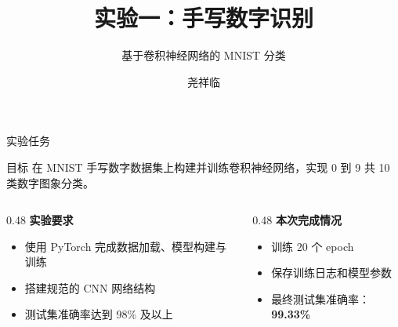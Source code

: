 \documentclass[aspectratio=169,10pt]{ctexbeamer}
\title{实验一：手写数字识别}
\subtitle{基于卷积神经网络的 MNIST 分类}
\author{尧祥临 \quad 202518023406038}
\institute{中国科学院大学 \quad 前沿交叉科学学院\\2026年春季学期\quad 深度学习}
\date{}
\begin{document}
\begin{frame}
	\titlepage
\end{frame}

\begin{frame}{实验任务}
	\begin{block}{目标}
		在 MNIST 手写数字数据集上构建并训练卷积神经网络，实现 0 到 9 共 10 类数字图象分类。
	\end{block}

	\begin{columns}[T,onlytextwidth]
		\begin{column}{0.48\textwidth}
			\textbf{实验要求}
			\begin{itemize}
				\item 使用 PyTorch 完成数据加载、模型构建与训练
				\item 搭建规范的 CNN 网络结构
				\item 测试集准确率达到 98\% 及以上
			\end{itemize}
		\end{column}
		\begin{column}{0.48\textwidth}
			\textbf{本次完成情况}
			\begin{itemize}
				\item 训练 20 个 epoch
				\item 保存训练日志和模型参数
				\item 最终测试集准确率：\textbf{99.33\%}
			\end{itemize}
		\end{column}
	\end{columns}
\end{frame}
\end{document}
